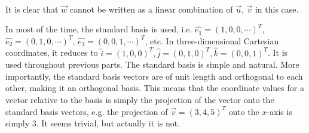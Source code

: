 \begin{center}
\\
It is clear that $\vec{w}$ cannot be written as a linear combination of $\vec{u}$, $\vec{v}$ in this case.
\end{center}
In most of the time, the standard basis is used, i.e. 
$\hat{e_1} = (1, 0, 0, \cdots)^T$, $\hat{e_2} = (0, 1, 0, \cdots)^T$, $\hat{e_3} = (0, 0, 1, \cdots)^T$, etc. In three-dimensional Cartesian coordinates, it reduces to $\hat{i} = (1, 0, 0)^T, \hat{j} = (0, 1, 0)^T, \hat{k} = (0, 0, 1)^T$. It is used throughout previous parts. The standard basis is simple and natural.
More importantly, the standard basis vectors are of unit length and orthogonal to each other, making it an orthogonal basis. This means that the coordinate values for a vector relative to the basis is simply the projection of the vector onto the standard basis vectors, e.g. the projection of $\vec{v} = (3,4,5)^T$ onto the $x$-axis is simply $3$. It seems trivial, but actually it is not.

